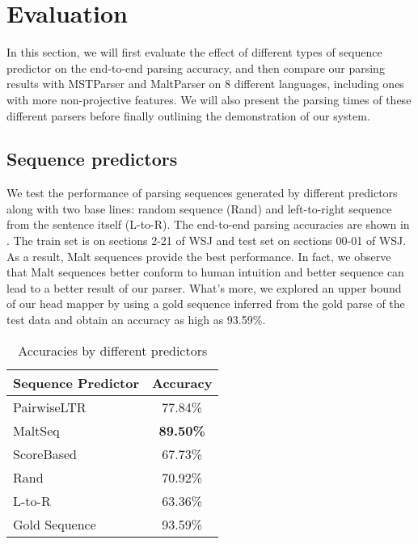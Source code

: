 \section{Evaluation}

In this section, we will first evaluate the effect of different types of
sequence predictor on the end-to-end parsing accuracy, and then compare
our parsing results with MSTParser and MaltParser on 8 different languages,
including ones with more non-projective features. We will also present the
parsing times of these different parsers before finally outlining the
demonstration of our system.


\subsection{Sequence predictors}
We test the performance of parsing sequences generated by
different predictors along with two base lines: random sequence (Rand) and
left-to-right sequence from the sentence itself (L-to-R).
The end-to-end parsing accuracies are shown in .
The train set is on sections 2-21 of WSJ and test set on sections 00-01 of WSJ.
As a result, Malt sequences provide the best performance. In fact, we observe that Malt sequences
better conform to human intuition and better sequence can lead to a better result of our parser.
What's more, we explored an upper bound of our head mapper by using
a gold sequence inferred from the gold parse of the test data
and obtain an accuracy as high as 93.59\%.
\begin{table}[ht]
  \centering
  \caption{Accuracies by different predictors}
    \begin{tabular}{lc}
    \toprule
    Sequence Predictor & Accuracy \\
    \midrule
    PairwiseLTR & 77.84\% \\
    MaltSeq & \bf{89.50}\% \\
    ScoreBased & 67.73\% \\
    Rand  & 70.92\% \\
    L-to-R & 63.36\% \\
    Gold Sequence & 93.59\% \\
    \bottomrule
    \end{tabular}%
  \label{tab:seqtest}%
\end{table}%

